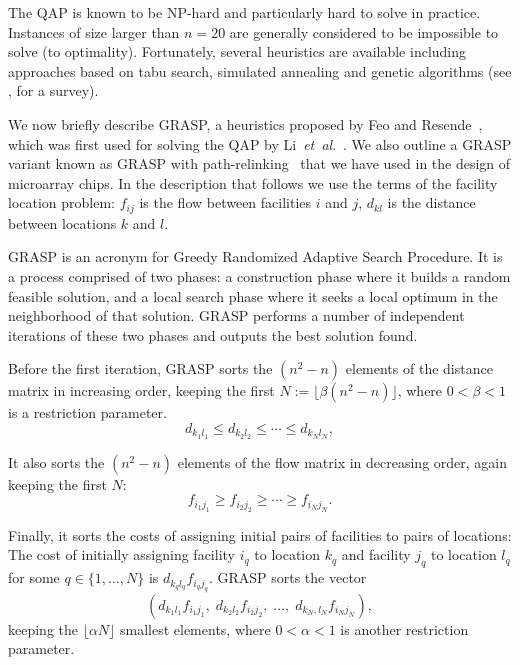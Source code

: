 \documentclass[english]{lni}
\begin{document}
The QAP is known to be NP-hard and particularly hard to solve in practice.
Instances of size
larger than $n = 20$ are generally considered to be impossible to solve (to
optimality). Fortunately, several heuristics are available including
approaches based on tabu search, simulated annealing and genetic algorithms
(see \cite{CELA98}, for a survey).

We now briefly describe GRASP, a heuristics proposed by Feo and
Resende~\cite{FEO95}, which was first used for solving the QAP by
Li~{\it et~al}.~\cite{LI94}. We also outline a GRASP
variant known as GRASP with path-relinking~\cite{OLIVEIRA04} that we have
used in the design of microarray chips. In the description that follows we use
the terms of the facility location problem: $f_{ij}$ is the flow between
facilities $i$ and $j$, $d_{kl}$ is the distance between locations $k$ and
$l$.

GRASP is an acronym for Greedy Randomized Adaptive Search Procedure. It is a
process comprised of two phases: a construction phase where it builds a random
feasible solution, and a local search phase where it seeks a local optimum in
the neighborhood of that solution. GRASP performs a number of independent
iterations of these two phases and outputs the best solution found.

Before the first iteration, GRASP sorts the $(n^2 - n)$ elements of the
distance matrix in increasing order, keeping the first $N:= \lfloor \beta (n^2 -
n) \rfloor$, where $0 < \beta < 1$ is a restriction parameter.
\begin{displaymath}
d_{k_1 l_1} \le d_{k_2 l_2} \le \cdots \le d_{k_N l_N},
\end{displaymath}

It also sorts the $(n^2 - n)$ elements of the flow matrix in decreasing order,
again keeping the first $N$:
\begin{displaymath}
f_{i_1 j_1} \ge f_{i_2 j_2} \ge \cdots \ge f_{i_N j_N}.
\end{displaymath}

Finally, it sorts the costs of assigning initial pairs of facilities to pairs
of locations: The cost of initially assigning facility $i_q$ to location $k_q$
and facility $j_q$ to location $l_q$
for some $q\in\{1,\ldots,N\}$ is $d_{k_q l_q} f_{i_q j_q}$. GRASP sorts
the vector
\begin{displaymath}
(d_{k_1 l_1}  f_{i_1 j_1},\;
d_{k_2 l_2}  f_{i_2 j_2},\; \ldots,\;
d_{k_N, l_N}  f_{i_N j_N}),
\end{displaymath}
keeping the $\lfloor \alpha N \rfloor$ smallest elements, where $0 < \alpha <
1$ is another restriction parameter.
\end{document}
